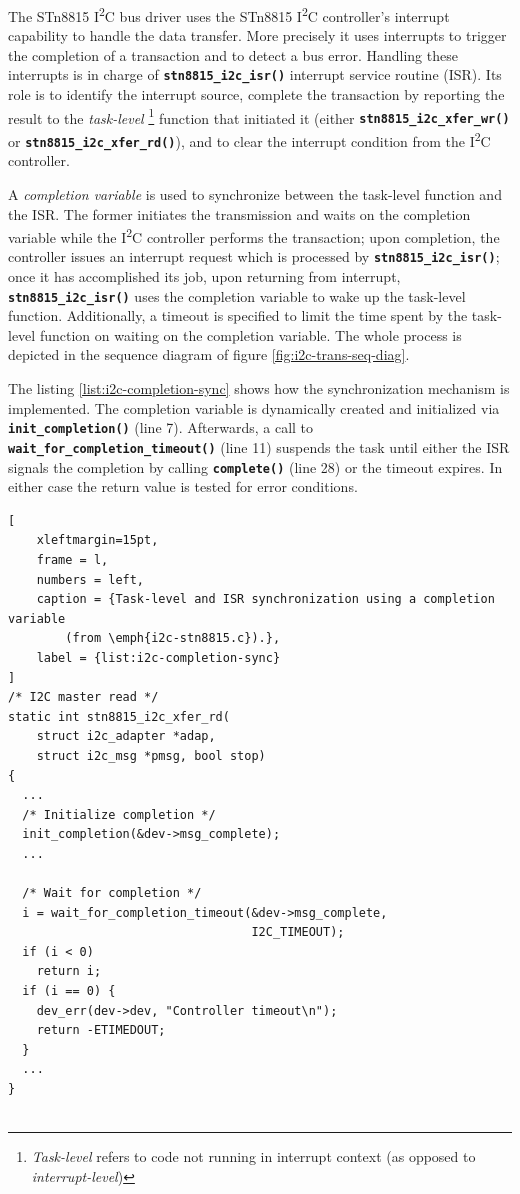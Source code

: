 \documentclass[a4paper,10pt]{article}
\newcommand{\icc}{I\textsuperscript{2}C }
\newcommand{\keyword}[1]{\texttt{\textbf{#1}}}
\begin{document}
\begin{multicols}{2}
The STn8815 \icc bus driver uses the STn8815 \icc controller's interrupt
capability to handle the data transfer. More precisely it uses interrupts to
trigger the completion of a transaction and to detect a bus error. Handling
these interrupts is in charge of \keyword{stn8815\_i2c\_isr()} interrupt service
routine (ISR).
Its role is to identify the interrupt source, complete the transaction
by reporting the result to the \emph{task-level}
\footnote{\emph{Task-level} refers to code not running in interrupt context
(as opposed to \emph{interrupt-level})}
function that initiated it (either \keyword{stn8815\_i2c\_xfer\_wr()} or
\keyword{stn8815\_i2c\_xfer\_rd()}), and to clear the interrupt condition from
the \icc controller.

A \emph{completion variable} is used to synchronize between the task-level
function and the ISR. The former initiates the transmission and waits on the
completion variable while the \icc controller performs the transaction; upon
completion, the controller issues an interrupt request which is processed by
\keyword{stn8815\_i2c\_isr()}; once it has accomplished its job, upon returning
from interrupt, \keyword{stn8815\_i2c\_isr()} uses the completion variable to
wake up the task-level function.
Additionally, a timeout is specified to limit the time spent by the task-level
function on waiting on the completion variable.
The whole process is depicted in the sequence diagram of figure
\ref{fig:i2c-trans-seq-diag}.

The listing \ref{list:i2c-completion-sync} shows how the synchronization
mechanism is implemented.
The completion variable is dynamically created and initialized via
\keyword{init\_completion()} (line 7). Afterwards, a call to
\keyword{wait\_for\_completion\_timeout()} (line 11) suspends the task until
either the ISR signals the completion by calling \keyword{complete()} (line 28)
or the timeout expires.  In either case the return value is tested for error
conditions.

\begin{lstlisting}[
	xleftmargin=15pt,
	frame = l,
	numbers = left,
	caption = {Task-level and ISR synchronization using a completion variable
		(from \emph{i2c-stn8815.c}).},
	label = {list:i2c-completion-sync}
]
/* I2C master read */
static int stn8815_i2c_xfer_rd(
    struct i2c_adapter *adap,
    struct i2c_msg *pmsg, bool stop)
{
  ...
  /* Initialize completion */
  init_completion(&dev->msg_complete);
  ...

  /* Wait for completion */
  i = wait_for_completion_timeout(&dev->msg_complete,
                                  I2C_TIMEOUT);
  if (i < 0)
    return i;
  if (i == 0) {
    dev_err(dev->dev, "Controller timeout\n");
    return -ETIMEDOUT;
  }
  ...
}


\end{lstlisting}
\end{multicols}
\end{document}
